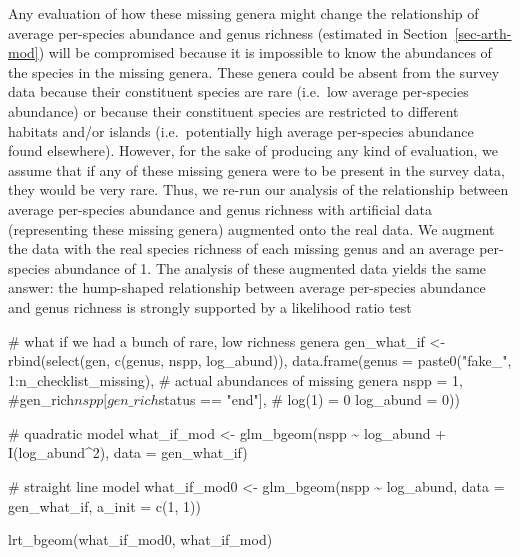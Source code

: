 \documentclass[
  letterpaper,
  DIV=11,
  numbers=noendperiod]{scrartcl}
\newenvironment{Shaded}{\begin{snugshade}}{\end{snugshade}}
\newcommand{\AttributeTok}[1]{\textcolor[rgb]{0.40,0.45,0.13}{#1}}
\newcommand{\CommentTok}[1]{\textcolor[rgb]{0.37,0.37,0.37}{#1}}
\newcommand{\DecValTok}[1]{\textcolor[rgb]{0.68,0.00,0.00}{#1}}
\newcommand{\FunctionTok}[1]{\textcolor[rgb]{0.28,0.35,0.67}{#1}}
\newcommand{\NormalTok}[1]{\textcolor[rgb]{0.00,0.23,0.31}{#1}}
\newcommand{\OtherTok}[1]{\textcolor[rgb]{0.00,0.23,0.31}{#1}}
\newcommand{\SpecialCharTok}[1]{\textcolor[rgb]{0.37,0.37,0.37}{#1}}
\newcommand{\StringTok}[1]{\textcolor[rgb]{0.13,0.47,0.30}{#1}}
\begin{document}
Any evaluation of how these missing genera might change the relationship
of average per-species abundance and genus richness (estimated in
Section~\ref{sec-arth-mod}) will be compromised because it is impossible
to know the abundances of the species in the missing genera. These
genera could be absent from the survey data because their constituent
species are rare (i.e.~low average per-species abundance) or because
their constituent species are restricted to different habitats and/or
islands (i.e.~potentially high average per-species abundance found
elsewhere). However, for the sake of producing any kind of evaluation,
we assume that if any of these missing genera were to be present in the
survey data, they would be very rare. Thus, we re-run our analysis of
the relationship between average per-species abundance and genus
richness with artificial data (representing these missing genera)
augmented onto the real data. We augment the data with the real species
richness of each missing genus and an average per-species abundance of
1. The analysis of these augmented data yields the same answer: the
hump-shaped relationship between average per-species abundance and genus
richness is strongly supported by a likelihood ratio test

\begin{Shaded}
\begin{Highlighting}[]
\CommentTok{\# what if we had a bunch of rare, low richness genera}
\NormalTok{gen\_what\_if }\OtherTok{\textless{}{-}} \FunctionTok{rbind}\NormalTok{(}\FunctionTok{select}\NormalTok{(gen, }\FunctionTok{c}\NormalTok{(genus, nspp, log\_abund)),}
                     \FunctionTok{data.frame}\NormalTok{(}\AttributeTok{genus =} \FunctionTok{paste0}\NormalTok{(}\StringTok{"fake\_"}\NormalTok{, }\DecValTok{1}\SpecialCharTok{:}\NormalTok{n\_checklist\_missing),}
                                \CommentTok{\# actual abundances of missing genera}
                                \AttributeTok{nspp =} \DecValTok{1}\NormalTok{, }\CommentTok{\#gen\_rich$nspp[gen\_rich$status == "end"],}
                                \CommentTok{\# log(1) = 0}
                                \AttributeTok{log\_abund =} \DecValTok{0}\NormalTok{))}

\CommentTok{\# quadratic model}
\NormalTok{what\_if\_mod }\OtherTok{\textless{}{-}} \FunctionTok{glm\_bgeom}\NormalTok{(nspp }\SpecialCharTok{\textasciitilde{}}\NormalTok{ log\_abund }\SpecialCharTok{+} \FunctionTok{I}\NormalTok{(log\_abund}\SpecialCharTok{\^{}}\DecValTok{2}\NormalTok{), }\AttributeTok{data =}\NormalTok{ gen\_what\_if)}

\CommentTok{\# straight line model}
\NormalTok{what\_if\_mod0 }\OtherTok{\textless{}{-}} \FunctionTok{glm\_bgeom}\NormalTok{(nspp }\SpecialCharTok{\textasciitilde{}}\NormalTok{ log\_abund, }\AttributeTok{data =}\NormalTok{ gen\_what\_if,}
                          \AttributeTok{a\_init =} \FunctionTok{c}\NormalTok{(}\DecValTok{1}\NormalTok{, }\DecValTok{1}\NormalTok{))}

\FunctionTok{lrt\_bgeom}\NormalTok{(what\_if\_mod0, what\_if\_mod)}
\end{Highlighting}
\end{Shaded}
\end{document}
